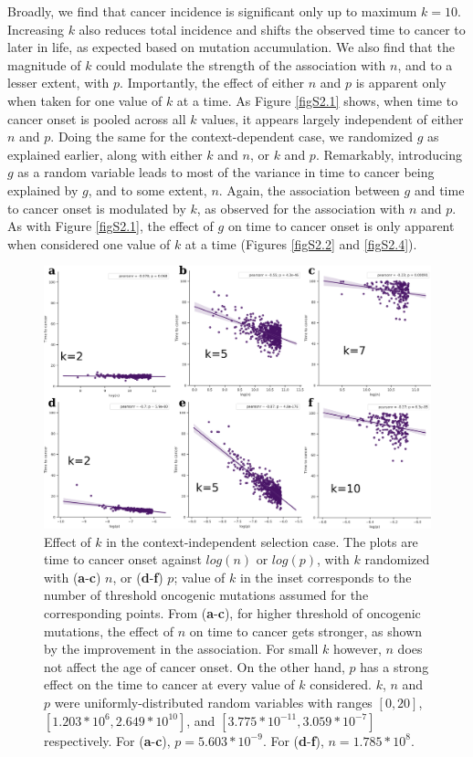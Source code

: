 \documentclass[12pt,onecolumn,twoside]{article}
\begin{document}
		Broadly, we find that cancer incidence is significant only up to maximum $k=10$. Increasing $k$ also reduces total incidence and shifts the observed time to cancer to later in life, as expected based on mutation accumulation. We also find that the magnitude of $k$ could modulate the strength of the association with $n$, and to a lesser extent, with $p$. Importantly, the effect of either $n$ and $p$ is apparent only when taken for one value of $k$ at a time. As Figure \ref{figS2.1} shows, when time to cancer onset is pooled across all $k$ values, it appears largely independent of either $n$ and $p$.
		Doing the same for the context-dependent case, we randomized $g$ as explained earlier, along with either $k$ and $n$, or $k$ and $p$. Remarkably, introducing $g$ as a random variable leads to most of the variance in time to cancer being explained by $g$, and to some extent, $n$. Again, the association between $g$ and time to cancer onset is modulated by $k$, as observed for the association with $n$ and $p$. As with Figure \ref{figS2.1}, the effect of $g$ on time to cancer onset is only apparent when considered one value of $k$ at a time (Figures \ref{figS2.2} and \ref{figS2.4}).

		\begin{figure}[tbhp]
			\centering
			\includegraphics[width=\linewidth, keepaspectratio=true]{figS2-3.png}
			\caption{Effect of $k$ in the context-independent selection case. The plots are time to cancer onset against $log(n)$ or $log(p)$, with $k$ randomized with (\textbf{a}-\textbf{c}) $n$, or (\textbf{d}-\textbf{f}) $p$; value of $k$ in the inset corresponds to the number of threshold oncogenic mutations assumed for the corresponding points. From (\textbf{a}-\textbf{c}), for higher threshold of oncogenic mutations, the effect of $n$ on time to cancer gets stronger, as shown by the improvement in the association. For small $k$ however, $n$ does not affect the age of cancer onset. On the other hand, $p$ has a strong effect on the time to cancer at every value of $k$ considered. $k$, $n$ and $p$ were uniformly-distributed random variables with ranges $[0, 20]$, $[1.203*10^{6}, 2.649*10^{10}]$, and $[3.775*10^{-11}, 3.059*10^{-7}]$ respectively. For (\textbf{a}-\textbf{c}), $p=5.603*10^{-9}$. For (\textbf{d}-\textbf{f}), $n=1.785*10^{8}$.}
			\label{figS2.3}
		\end{figure}
\end{document}
